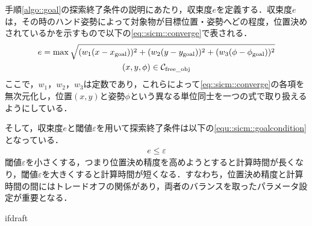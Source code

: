 \documentclass[a4paper,twoside,12pt,papersize, dvipdfmx]{iirthesis}
\begin{document}
手順\ref{algo::goal}の探索終了条件の説明にあたり，収束度$e$を定義する．収束度$e$は，その時のハンド姿勢によって対象物が目標位置・姿勢へどの程度，位置決めされているかを示すもので以下の\eqref{eq::sicm::converge}で表される．
\begin{gather}
\label{eq::sicm::converge}
e = \max \sqrt{(w_1(x-x_{\mathrm{goal}}))^2+(w_2(y-y_{\mathrm{goal}}))^2 + (w_3(\phi-\phi_{\mathrm{goal}}))^2} \\
(x, y, \phi) \in \mathcal{C}_{\mathrm{free\_obj}} \notag
\end{gather}
ここで，$w_1$，$w_2$，$w_3$は定数であり，これらによって\eqref{eq::sicm::converge}の各項を無次元化し，位置$(x, y)$と姿勢$\phi$という異なる単位同士を一つの式で取り扱えるようにしている．\par
そして，収束度$e$と閾値$\varepsilon$を用いて探索終了条件は以下の\eqref{equ::sicm::goalcondition}となっている．
\begin{gather}
e \leq \varepsilon
\end{gather}
閾値$\varepsilon$を小さくする，つまり位置決め精度を高めようとすると計算時間が長くなり，閾値$\varepsilon$を大きくすると計算時間が短くなる．すなわち，位置決め精度と計算時間の間にはトレードオフの関係があり，両者のバランスを取ったパラメータ設定が重要となる．

\expandafter\ifx\csname ifdraft\endcsname\relax
    
\end{document}
